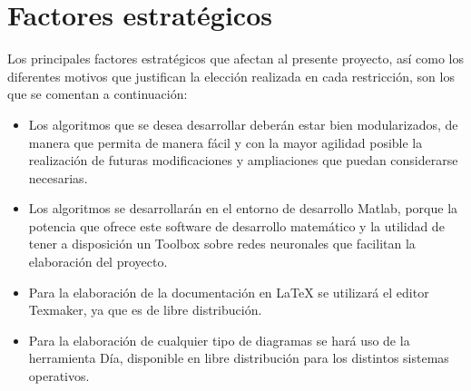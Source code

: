 	\section{Factores estratégicos}
	
		Los principales factores estratégicos que afectan al presente proyecto, así como los diferentes motivos que justifican la elección realizada en cada restricción, son los que se comentan a continuación:
		
		\begin{itemize}
			\item Los algoritmos que se desea desarrollar deberán estar bien modularizados, de manera que permita de manera fácil y con la mayor agilidad posible la realización de futuras modificaciones y ampliaciones que puedan considerarse necesarias.
			\item Los algoritmos se desarrollarán en el entorno de desarrollo Matlab, porque la potencia que ofrece este software de desarrollo matemático y la utilidad de tener a disposición un Toolbox sobre redes neuronales que facilitan la elaboración del proyecto.
			\item Para la elaboración de la documentación en \LaTeX{} se utilizará el editor Texmaker, ya que es de libre distribución.
			\item Para la elaboración de cualquier tipo de diagramas se hará uso de la herramienta Día, disponible en libre distribución para los distintos sistemas operativos.
		\end{itemize}
